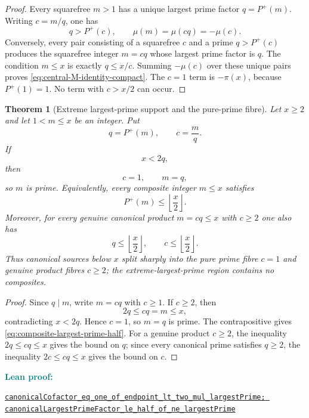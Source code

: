 \documentclass[11pt]{article}
\newtheorem{theorem}{Theorem}[section]
\theoremstyle{definition}
\newcommand{\Pplus}{P^{+}}
\newcommand{\1}{\mathbf{1}}
\newcommand{\leanxref}[3]{%
  \par\smallskip
  {\small\noindent\textcolor{teal}{\textbf{#1:}}\par
  \noindent\href{#3}{\nolinkurl{#2}}\par}
  \smallskip
}
\begin{document}
\begin{proof}
Every squarefree $m>1$ has a unique largest prime factor
$q=\Pplus(m)$.  Writing $c=m/q$, one has
\[
 q>\Pplus(c),
 \qquad
 \mu(m)=\mu(cq)=-\mu(c).
\]
Conversely, every pair consisting of a squarefree $c$ and a prime
$q>\Pplus(c)$ produces the squarefree integer $m=cq$ whose largest
prime factor is $q$.  The condition $m\le x$ is exactly $q\le x/c$.
Summing $-\mu(c)$ over these unique pairs proves
\cref{eq:central-M-identity-compact}.  The $c=1$ term is
$-\pi(x)$, because $\Pplus(1)=1$.  No term with $c>x/2$ can occur.
\end{proof}

\begin{theorem}[Extreme largest-prime support and the pure-prime fibre]
\label{thm:extreme-largest-prime}
Let $x\ge2$ and let $1<m\le x$ be an integer.  Put
\[
 q=\Pplus(m),\qquad c=\frac{m}{q}.
\]
If
\begin{equation}
 x<2q,
 \label{eq:extreme-q-condition}
\end{equation}
then
\begin{equation}
 \boxed{c=1,\qquad m=q,}
 \label{eq:extreme-prime-fibre}
\end{equation}
so $m$ is prime.  Equivalently, every composite integer $m\le x$ satisfies
\begin{equation}
 \boxed{\Pplus(m)\le\left\lfloor\frac{x}{2}\right\rfloor.}
 \label{eq:composite-largest-prime-half}
\end{equation}
Moreover, for every genuine canonical product $m=cq\le x$ with $c\ge2$ one also has
\begin{equation}
 \boxed{q\le\left\lfloor\frac{x}{2}\right\rfloor,\qquad
 c\le\left\lfloor\frac{x}{2}\right\rfloor.}
 \label{eq:both-canonical-factors-half}
\end{equation}
Thus canonical sources below $x$ split sharply into the pure prime fibre $c=1$ and genuine product fibres $c\ge2$; the extreme-largest-prime region contains no composites.
\end{theorem}

\begin{proof}
Since $q\mid m$, write $m=cq$ with $c\ge1$.  If $c\ge2$, then
\[
 2q\le cq=m\le x,
\]
contradicting $x<2q$.  Hence $c=1$, so $m=q$ is prime.  The contrapositive gives \cref{eq:composite-largest-prime-half}.  For a genuine product $c\ge2$, the inequality $2q\le cq\le x$ gives the bound on $q$; since every canonical prime satisfies $q\ge2$, the inequality $2c\le cq\le x$ gives the bound on $c$.
\end{proof}
\leanxref{Lean proof}{canonicalCofactor_eq_one_of_endpoint_lt_two_mul_largestPrime; canonicalLargestPrimeFactor_le_half_of_ne_largestPrime}{https://github.com/OVVO-Financial/square-block-mobius/blob/main/lean/RHLean/Analysis/CanonicalExtremePrimeSupport.lean}
\end{document}
